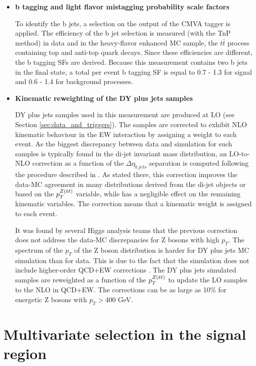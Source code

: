 \begin{itemize}
\item{\bfseries b tagging and light flavor mistagging probability scale factors} 

To identify the b jets, a selection on the output of the CMVA tagger is applied. The efficiency of the b jet selection is measured (with the TnP method) in data and in the heavy-flavor enhanced MC sample, the $t\bar{t}$ process containing top and anti-top quark decays. Since these efficiencies are different, the b tagging SFs are derived. Because this measurement contains two b jets in the final state, a total per event b tagging SF is equal to 0.7 - 1.3 for signal and 0.6 - 1.4 for background processes. 

\item{\bfseries Kinematic reweighting of the DY plus jets samples} 
\label{DY_reweighting}

DY plus jets samples used in this measurement are produced at LO (see Section \ref{sec:data_and_triggers}). The samples are corrected to exhibit NLO kinematic behaviour in the EW interaction by assigning a weight to each event. As the biggest discrepancy between data and simulation for such samples is typically found in the di-jet invariant mass distribution, an LO-to-NLO correction as a function of the $\Delta \eta_{b\ jets}$ separation is computed following the procedure described in \cite{DYLOtoNLO}. As stated there, this correction improves the data-MC agreement in many distributions derived from the di-jet objects or based on the $p_T^{Z(\ell\ell)}$ variable, while has a negligible effect on the remaining kinematic variables. The correction means that a kinematic weight is assigned to each event.

It was found by several Higgs analysis teams that the previous correction does not address the data-MC discrepancies for Z bosons with high $p_T$. The spectrum of the $p_T$ of the Z boson distribution is harder for DY plus jets MC simulation than for data. This is due to the fact that the simulation does not include higher-order QCD+EW corrections \cite{NLO_Vjets}. The DY plus jets simulated samples are reweighted as a function of the $p_T^{Z(\ell\ell)}$ to update the LO samples to the NLO in QCD+EW. The corrections can be as large as 10\% for energetic Z bosons with $p_T > 400$ GeV.

\end{itemize}

\section{Multivariate selection in the signal region}

